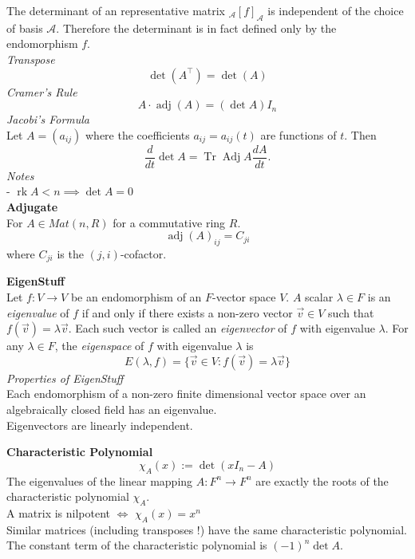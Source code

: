 \documentclass[a4paper, 10pt]{article}
\begin{document}
\begin{multicols*}{3}
The determinant of an representative matrix ${ }_{\mathcal{A}}[f]_{\mathcal{A}}$ is independent of the choice of basis $\mathcal{A}$. Therefore the determinant is in fact defined only by the endomorphism $f$. \\
\textit{Transpose}
\[
\operatorname{det}\left(A^{\top}\right)=\operatorname{det}(A)
\]
\textit{Cramer's Rule}\\
\[
A \cdot \operatorname{adj}(A)=(\operatorname{det} A) I_n
\]
\textit{Jacobi's Formula}\\
Let $A=\left(a_{i j}\right)$ where the coefficients $a_{i j}=a_{i j}(t)$ are functions of $t$. Then
\[
\frac{d}{d t} \operatorname{det} A=\operatorname{Tr} \operatorname{Adj} A \frac{d A}{d t} .
\]
\textit{Notes}\\
- $\operatorname{rk} A < n \implies \det A = 0$\\

\textbf{Adjugate}\\
For $A\in Mat(n, R)$ for a commutative ring $R$. 
$$\operatorname{adj}(A)_{i j}=C_{j i}$$ where $C_{j i}$ is the $(j, i)$-cofactor.

\textbf{EigenStuff}\\
Let $f: V \rightarrow V$ be an endomorphism of an $F$-vector space $V$. $A$ scalar $\lambda \in F$ is an \textit{eigenvalue} of $f$ if and only if there exists a non-zero vector $\vec{v} \in V$ such that $f(\vec{v})=\lambda \vec{v}$. Each such vector is called an \textit{eigenvector} of $f$ with eigenvalue $\lambda$. For any $\lambda \in F$, the \textit{eigenspace} of $f$ with eigenvalue $\lambda$ is
$$
E(\lambda, f)=\{\vec{v} \in V: f(\vec{v})=\lambda \vec{v}\}
$$
\textit{Properties of EigenStuff}\\
Each endomorphism of a non-zero finite dimensional vector space over an algebraically closed field has an eigenvalue.\\
Eigenvectors are linearly independent. 

\textbf{Characteristic Polynomial}
$$\chi_A(x):=\operatorname{det}\left(x I_n-A\right)$$
The eigenvalues of the linear mapping $A: F^n \rightarrow F^n$ are exactly the roots of the characteristic polynomial $\chi_A$.\\
A matrix is nilpotent $\iff$ $\chi_A(x)=x^n$\\
Similar matrices (including transposes !) have the same characteristic polynomial.\\
The constant term of the characteristic polynomial is $(-1)^n \operatorname{det} A$.


\end{multicols*}
\end{document}

